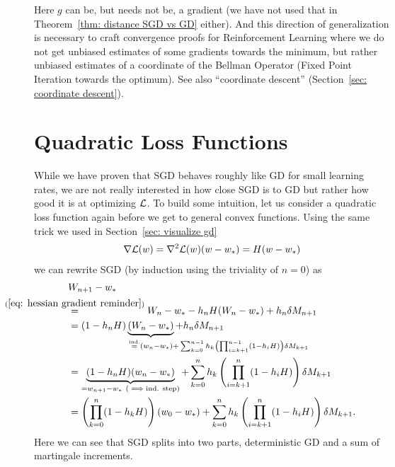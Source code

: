 Here \(g\) can be, but needs not be, a gradient (we have not used that in
Theorem~\ref{thm: distance SGD vs GD} either). And this direction of
generalization is necessary to craft convergence proofs for Reinforcement
Learning where we do not get unbiased estimates of some gradients towards the
minimum, but rather unbiased estimates of a coordinate of the Bellman Operator
(Fixed Point Iteration towards the optimum). See also ``coordinate descent''
(Section~\ref{sec: coordinate descent}).


\section{Quadratic Loss Functions}\label{sec: quadratic loss SGD}

While we have proven that SGD behaves roughly like GD for small learning rates, we
are not really interested in how close SGD is to GD but rather how good it
is at optimizing \(\mathcal{L}\). To build some intuition, let us consider a
quadratic loss function again before we get to general convex functions.
Using the same trick we used in Section~\ref{sec: visualize gd} 
\begin{align}\label{eq: hessian gradient reminder}
	\nabla\mathcal{L}(w)
	= \nabla^2\mathcal{L}(w)(w-w_*)
	= H(w-w_*)
\end{align}
we can rewrite SGD (by induction using the triviality of \(n=0\)) as
\begin{align}
	\nonumber
	&\Weights_{n+1}-\minimum\\
	\nonumber
	&\lxeq{(\ref{eq: hessian gradient reminder})}
	\Weights_n - \minimum - \lr_n H(\Weights_n-\minimum) + \lr_n\martIncr_{n+1}\\
	\label{eq: recursive SGD formula in the quadratic case}
	&=(1-\lr_n H)\underbrace{(\Weights_n - \minimum)}_{
		\xeq{\text{ind.}} (\weights_n - \minimum)
		\mathrlap{+ \sum_{k=0}^{n-1}\lr_k\left(\prod_{i=k+1}^{n-1}(1-\lr_iH)\right)\martIncr_{k+1}}
	} + \lr_n\martIncr_{n+1}\\
	\nonumber
	&= \underbrace{(1-\lr_n H)(\weights_n - \minimum)}_{=\weights_{n+1}-\minimum\ (\implies\text{ind. step})}
	+ \sum_{k=0}^n\lr_k\left(\prod_{i=k+1}^n(1-\lr_iH)\right)\martIncr_{k+1}\\
	\label{eq: unrolled SGD weights (general quadratic loss case)}
	&=\left(\prod_{k=0}^n(1-\lr_kH)\right)(\weights_0-\minimum)
	+ \sum_{k=0}^n\lr_k\left(\prod_{i=k+1}^n(1-\lr_iH)\right)\martIncr_{k+1}.
\end{align}
Here we can see that SGD splits into two parts, deterministic GD and a sum of
martingale increments.

